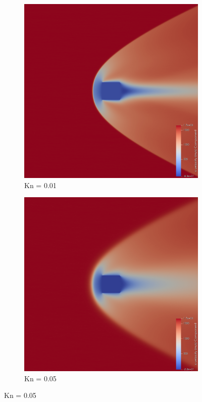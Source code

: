 \begin{figure}
\begin{subfigure}{0.32\textwidth}
        \includegraphics[width=\textwidth]{Images/4. Results/Square Kn/pv/Kn0.01.png}
        \caption{Kn = 0.01}
    \end{subfigure}
    \hfill
    \begin{subfigure}{0.32\textwidth}
        \centering
        \includegraphics[width=\textwidth]{Images/4. Results/Square Kn/pv/Kn0.05.png}
        \caption{Kn = 0.05}
    \end{subfigure}
    

\end{figure}
